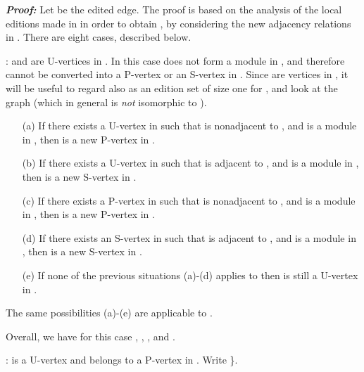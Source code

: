 \documentclass[12pt]{article}
\begin{document}
\noindent \emph{\textbf{Proof:}} Let  be the edited
edge. The proof is based on the analysis of the local editions
made in  in order to obtain , by
considering the new adjacency relations in . There are eight
cases, described below.

\medskip

:  and  are U-vertices in . In this case  does not form a module in , and
therefore cannot be converted into a P-vertex or an S-vertex in
. Since  are vertices in , it
will be useful to regard  also as an edition set of size
one for , and look at the graph 
(which in general is \emph{not} isomorphic to ).

\medskip

\begin{itemize}

\item[(a)] If there exists a U-vertex  in  such
that  is nonadjacent to , and  is a module in
, then  is a new P-vertex in
.


\item[(b)] If there exists a U-vertex  in  such
that  is adjacent to , and  is a module in
, then  is a new S-vertex in
.


\item[(c)] If there exists a P-vertex  in  such
that  is nonadjacent to , and  is a module in
, then  is a new P-vertex in
.


\item[(d)] If there exists an S-vertex  in  such
that  is adjacent to , and  is a module in
, then  is a new S-vertex in
.


\item[(e)] If none of the previous situations (a)-(d) applies to
 then  is still a U-vertex in .

\end{itemize}

The same possibilities (a)-(e) are applicable to .

Overall, we have for this case , , , and .

\medskip

:  is a U-vertex and  belongs to a
P-vertex  in .
Write \}.
\end{document}
